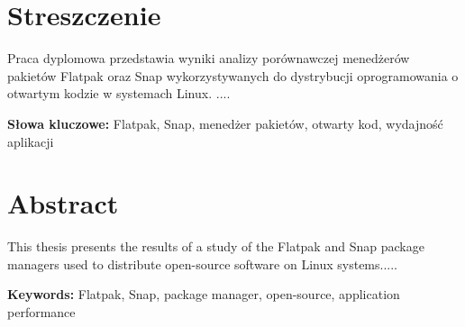 \section*{Streszczenie}

Praca dyplomowa przedstawia wyniki analizy porównawczej  menedżerów pakietów Flatpak oraz Snap wykorzystywanych do dystrybucji oprogramowania o otwartym kodzie w systemach Linux. ....

\textbf{Słowa kluczowe:} Flatpak, Snap, menedżer pakietów, otwarty kod, wydajność aplikacji

\section*{Abstract}
This thesis presents the results of a study of the Flatpak and Snap package managers used to distribute open-source software on Linux systems.....

\textbf{Keywords:} Flatpak, Snap, package manager, open-source, application performance